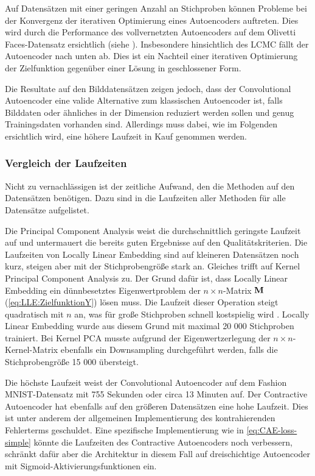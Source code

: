 Auf Datensätzen mit einer geringen Anzahl an Stichproben können Probleme bei der Konvergenz der iterativen Optimierung eines Autoencoders auftreten. Dies wird durch die Performance des vollvernetzten Autoencoders auf dem Olivetti Faces-Datensatz ersichtlich (siehe ). Insbesondere hinsichtlich des LCMC fällt der Autoencoder nach unten ab. Dies ist ein Nachteil einer iterativen Optimierung der Zielfunktion gegenüber einer Lösung in geschlossener Form.

Die Resultate auf den Bilddatensätzen zeigen jedoch, dass der Convolutional Autoencoder eine valide
Alternative zum klassischen Autoencoder ist, falls Bilddaten oder ähnliches in der Dimension
reduziert werden sollen und genug Trainingsdaten vorhanden sind. Allerdings muss dabei, wie im
Folgenden ersichtlich wird, eine höhere Laufzeit in Kauf genommen werden.

\subsubsection{Vergleich der Laufzeiten}

Nicht zu vernachlässigen ist der zeitliche Aufwand, den die Methoden auf den Datensätzen benötigen.
Dazu sind in  die Laufzeiten aller Methoden für alle Datensätze
aufgelistet.


Die Principal Component Analysis weist die durchschnittlich geringste Laufzeit auf und untermauert die bereits guten Ergebnisse auf den Qualitätskriterien. Die Laufzeiten von Locally Linear Embedding sind auf kleineren Datensätzen noch kurz, steigen aber mit der Stichprobengröße stark an. Gleiches trifft auf Kernel Principal Component Analysis zu. Der Grund dafür ist, dass Locally Linear Embedding ein dünnbesetztes Eigenwertproblem der $n \times n$-Matrix $\mathbf{M}$ (\eqref{eq:LLE:ZielfunktionY}) lösen muss. Die Laufzeit dieser Operation steigt quadratisch mit $n$ an, was für große Stichproben schnell kostspielig wird \parencite[9]{Saul.2000}. Locally Linear Embedding wurde aus diesem Grund mit maximal 20 000
Stichproben trainiert. Bei Kernel PCA musste aufgrund der Eigenwertzerlegung der $n \times
	n$-Kernel-Matrix ebenfalls ein Downsampling durchgeführt werden, falls die Stichprobengröße 15 000
übersteigt.

Die höchste Laufzeit weist der Convolutional Autoencoder auf dem Fashion MNIST-Datensatz mit 755
Sekunden oder circa 13 Minuten auf. Der Contractive Autoencoder hat ebenfalls auf den größeren
Datensätzen eine hohe Laufzeit. Dies ist unter anderem der allgemeinen Implementierung des
kontrahierenden Fehlerterms geschuldet. Eine spezifische Implementierung wie in
\eqref{eq:CAE-loss-simple} könnte die Laufzeiten des Contractive Autoencoders noch verbessern,
schränkt dafür aber die Architektur in diesem Fall auf dreischichtige Autoencoder mit
Sigmoid-Aktivierungsfunktionen ein.

